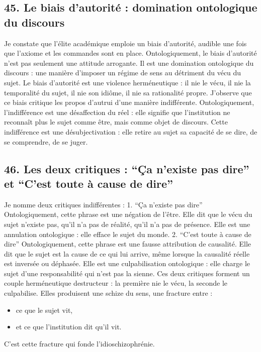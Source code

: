 \documentclass[12pt,letterpaper,oneside]{article}
\begin{document}
\subsection*{45. Le biais d’autorité : domination ontologique du discours}
Je constate que l’élite académique emploie un biais d’autorité, audible une fois que l’axiome et les commandes sont en place. Ontologiquement, le biais d’autorité n’est pas seulement une attitude arrogante. Il est une domination ontologique du discours : une manière d’imposer un régime de sens au détriment du vécu du sujet.
Le biais d’autorité est une violence herméneutique : il nie le vécu, il nie la temporalité du sujet, il nie son idiôme, il nie sa rationalité propre.
J’observe que ce biais critique les propos d’autrui d’une manière indifférente. Ontologiquement, l’indifférence est une désaffection du réel : elle signifie que l’institution ne reconnaît plus le sujet comme être, mais comme objet de discours.
Cette indifférence est une désubjectivation : elle retire au sujet sa capacité de se dire, de se comprendre, de se juger.

\subsection*{46. Les deux critiques : “Ça n’existe pas dire” et “C’est toute à cause de dire”}
Je nomme deux critiques indifférentes :
1. “Ça n’existe pas dire”
Ontologiquement, cette phrase est une négation de l’être. Elle dit que le vécu du sujet n’existe pas, qu’il n’a pas de réalité, qu’il n’a pas de présence. Elle est une annulation ontologique : elle efface le sujet du monde.
2. “C’est toute à cause de dire”
Ontologiquement, cette phrase est une fausse attribution de causalité. Elle dit que le sujet est la cause de ce qui lui arrive, même lorsque la causalité réelle est inversée ou déphasée. Elle est une culpabilisation ontologique : elle charge le sujet d’une responsabilité qui n’est pas la sienne.
Ces deux critiques forment un couple herméneutique destructeur : la première nie le vécu, la seconde le culpabilise.
Elles produisent une schize du sens, une fracture entre :
\begin{itemize}
\item ce que le sujet vit,
\item et ce que l’institution dit qu’il vit.
\end{itemize}
C’est cette fracture qui fonde l’idioschizophrénie.
\end{document}
